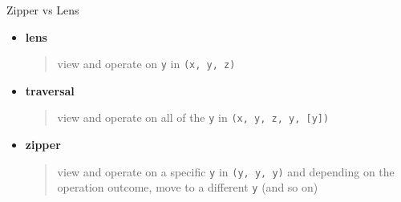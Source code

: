 \begin{frame}
\begin{block}{Zipper vs Lens}
\begin{center}
\begin{itemize}
  \item \textbf{lens} \begin{quote}view and operate on \lstinline{y} in \lstinline{(x, y, z)}\end{quote}
  \item \textbf{traversal} \begin{quote}view and operate on all of the \lstinline{y} in \lstinline{(x, y, z, y, [y])}\end{quote}
  \item \textbf{zipper} \begin{quote}view and operate on a specific \lstinline{y} in \lstinline{(y, y, y)} and depending on the operation outcome, move to a different \lstinline{y} (and so on)\end{quote}
\end{itemize}
\end{center}
\end{block}
\end{frame}
